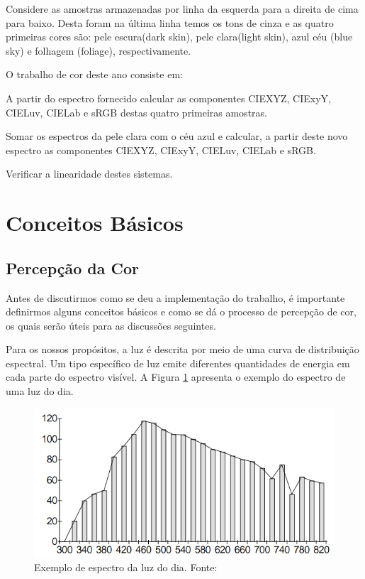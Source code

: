 \documentclass[a4paper,10pt]{report}
\begin{document}
\par
Considere as amostras armazenadas por linha da esquerda para a direita de cima
para baixo.  Desta foram na última linha temos os tons de cinza e as quatro
primeiras cores são: pele escura(dark skin), pele clara(light skin), azul céu
(blue sky) e folhagem (foliage), respectivamente.  

\par
O trabalho de cor deste ano consiste em:
\begin{list}{:~}{}
\item A partir do espectro fornecido calcular as componentes CIEXYZ,
CIExyY, CIELuv, CIELab e sRGB destas quatro primeiras amostras.
\item Somar os espectros da pele clara com o céu azul e calcular, a partir deste
novo espectro as componentes CIEXYZ, CIExyY, CIELuv, CIELab e sRGB.
\item Verificar a linearidade destes sistemas.
\end{list}

\section{Conceitos Básicos}
\subsection{Percepção da Cor}
\par
Antes de discutirmos como se deu a implementação do trabalho, é importante
definirmos alguns conceitos básicos e como se dá o processo de percepção de
cor, os quais serão úteis para as discussões seguintes.

\par
Para os nossos propósitos, a luz é descrita por meio de uma curva de
distribuição espectral. Um tipo específico de luz emite diferentes quantidades
de energia em cada parte do espectro visível. A Figura
\ref{fig:visible_spectrum} apresenta o exemplo do espectro de uma luz do dia.

\begin{figure}[!htb]
     \centering
     \includegraphics[scale=0.8]{img/spectrum_light.png}
     \caption{Exemplo de espectro da luz do dia. Fonte:
}
     \label{fig:visible_spectrum}
\end{figure}
\end{document}
